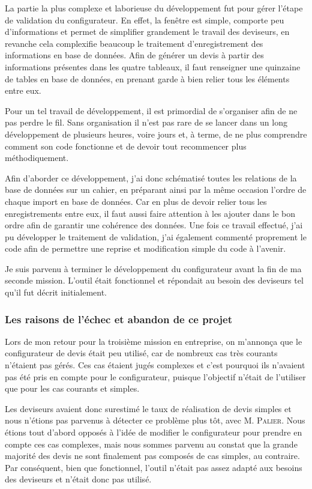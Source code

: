 La partie la plus complexe et laborieuse du développement fut pour gérer l'étape de validation du configurateur.
En effet, la fenêtre est simple, comporte peu d'informations et permet de simplifier grandement le travail des deviseurs, en revanche cela complexifie beaucoup le traitement d'enregistrement des informations en base de données.
Afin de générer un devis à partir des informations présentes dans les quatre tableaux, il faut renseigner une quinzaine de tables en base de données, en prenant garde à bien relier tous les éléments entre eux.

Pour un tel travail de développement, il est primordial de s'organiser afin de ne pas perdre le fil.
Sans organisation il n'est pas rare de se lancer dans un long développement de plusieurs heures, voire jours et, à terme, de ne plus comprendre comment son code fonctionne et de devoir tout recommencer plus méthodiquement.

Afin d'aborder ce développement, j'ai donc schématisé toutes les relations de la base de données sur un cahier, en préparant ainsi par la même occasion l'ordre de chaque import en base de données.
Car en plus de devoir relier tous les enregistrements entre eux, il faut aussi faire attention à les ajouter dans le bon ordre afin de garantir une cohérence des données.
Une fois ce travail effectué, j'ai pu développer le traitement de validation, j'ai également commenté proprement le code afin de permettre une reprise et modification simple du code à l'avenir.

Je suis parvenu à terminer le développement du configurateur avant la fin de ma seconde mission.
L'outil était fonctionnel et répondait au besoin des deviseurs tel qu'il fut décrit initialement.

\subsubsection{Les raisons de l'échec et abandon de ce projet}

Lors de mon retour pour la troisième mission en entreprise, on m'annonça que le configurateur de devis était peu utilisé, car de nombreux cas très courants n'étaient pas gérés.
Ces cas étaient jugés complexes et c'est pourquoi ils n'avaient pas été pris en compte pour le configurateur, puisque l'objectif n'était de l'utiliser que pour les cas courants et simples.

Les deviseurs avaient donc surestimé le taux de réalisation de devis simples et nous n'étions pas parvenus à détecter ce problème plus tôt, avec M. \textsc{Palier}.
Nous étions tout d'abord opposés à l'idée de modifier le configurateur pour prendre en compte ces cas complexes, mais nous sommes parvenu au constat que la grande majorité des devis ne sont finalement pas composés de cas simples, au contraire.
Par conséquent, bien que fonctionnel, l'outil n'était pas assez adapté aux besoins des deviseurs et n'était donc pas utilisé.


